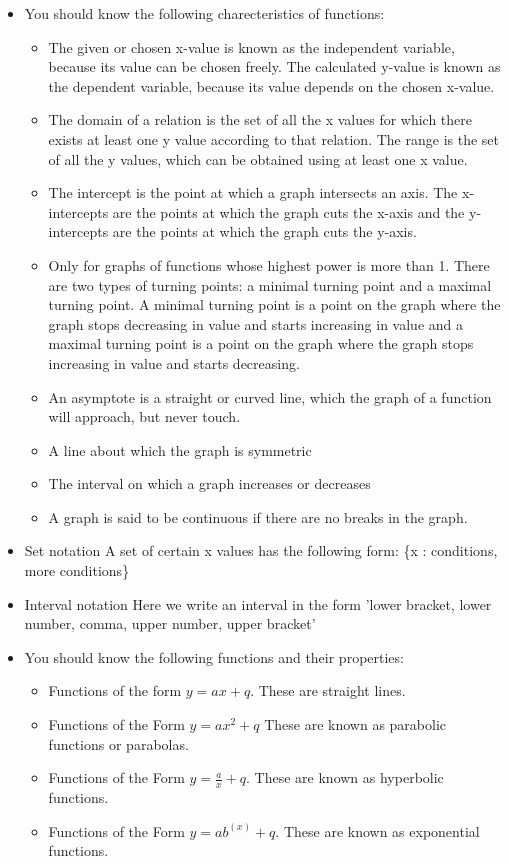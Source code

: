             \label{m39348*eip-408}\begin{itemize}[noitemsep]
            \item You should know the following charecteristics of functions: \label{m39348*id69342}\begin{itemize}[noitemsep]
            \item The given or chosen x-value is known as the independent variable, because its value can be chosen freely. The calculated y-value is known as the dependent variable, because its value depends on the chosen x-value.\item The domain of a relation is the set of all the x values for which there exists at least one y value according to that relation. The range is the set of all the y values, which can be obtained using at least one x value.\item The intercept is the point at which a graph intersects an axis. The x-intercepts are the points at which the graph cuts the x-axis and the y-intercepts are the points at which the graph cuts the y-axis. \item Only for graphs of functions whose highest power is more than 1. There are two types of turning points: a minimal turning point and a maximal turning point. A minimal turning point is a point on the graph where the graph stops decreasing in value and starts increasing in value and a maximal turning point is a point on the graph where the graph stops increasing in value and starts decreasing. \item An asymptote is a straight or curved line, which the graph of a function will approach, but never touch.\item A line about which the graph is symmetric\item  The interval on which a graph increases or decreases\item A graph is said to be continuous if there are no breaks in the graph. \end{itemize}
        \item 
Set notation
	A set of certain x values has the following form: \{x : conditions, more conditions\}\item 
Interval notation
	Here we write an interval in the form 'lower bracket, lower number, comma, upper number, upper bracket'\item  You should know the following functions and their properties:\label{m39348*id679348}\begin{itemize}[noitemsep]
            \item 
Functions of the form $y=ax+q$. These are straight lines.\item 
Functions of the Form $y=a{x}^{2}+q$ These are known as parabolic functions or parabolas.\item 
Functions of the Form $y=\frac{a}{x}+q$. These are known as hyperbolic functions.\item 
Functions of the Form $y=a{b}^{\left(x\right)}+q$. These are known as exponential functions.\end{itemize}
        \end{itemize}
        \label{m39348*cid7}
